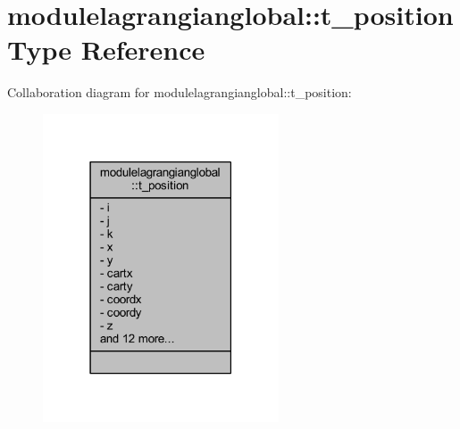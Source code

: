 \hypertarget{structmodulelagrangianglobal_1_1t__position}{}\section{modulelagrangianglobal\+:\+:t\+\_\+position Type Reference}
\label{structmodulelagrangianglobal_1_1t__position}


Collaboration diagram for modulelagrangianglobal\+:\+:t\+\_\+position\+:\nopagebreak
\begin{figure}[H]
\begin{center}
\leavevmode
\includegraphics[width=198pt]{structmodulelagrangianglobal_1_1t__position__coll__graph}
\end{center}
\end{figure}
